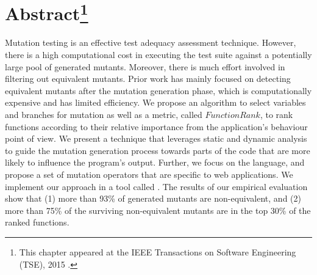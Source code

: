 \section*{Abstract\footnote{This chapter appeared at the IEEE Transactions on Software Engineering (TSE), 2015 \cite{mirshokraie:tse15}.}}
Mutation testing is an effective test adequacy assessment technique. However, there is a high computational cost in executing the test suite against a potentially large pool of generated mutants. Moreover, there is much effort involved in filtering out equivalent mutants. Prior work has mainly focused on detecting equivalent mutants after the mutation generation phase, which is computationally expensive and has limited efficiency. We propose an algorithm to select variables and branches for mutation as well as a metric, called $FunctionRank$, to rank functions according to their relative importance from the application's behaviour point of view. We present a technique that leverages static and dynamic analysis to guide the mutation generation process towards parts of the code that are more likely to influence the program's output. Further, we focus on the \javascript language, and propose a set of mutation operators that are specific to web applications. We implement our approach in a tool called \mutandis. The results of our empirical evaluation show that 
(1) more than 93\% of generated mutants are non-equivalent, 
and (2) more than 75\% of the surviving non-equivalent mutants
are in the top 30\% of the ranked functions.
